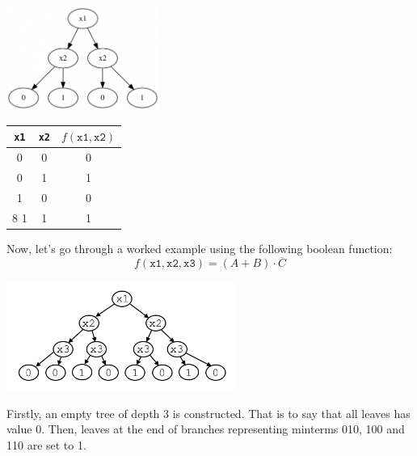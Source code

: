 \documentclass[12pt]{article}
\begin{document}
    \begin{minipage}{\linewidth}
        \begin{multicols}{2}
            \begin{center} \null \vfill
                \includegraphics[width=5cm, interpolate]{rsc/bt2.png}
                \parbox{\linewidth}{}

                \columnbreak
                \null \vfill

                \begin{tabular}[t]{ c|c|c }
                    \texttt{x1} & \texttt{x2}   & $f(\texttt{x1},\texttt{x2})$ \\ \hline
                    0           & 0             & 0 \\
                    0           & 1             & 1 \\ \hline\hline
                    1           & 0             & 0 \\8
                    1           & 1             & 1
                \end{tabular}  \null \vspace{2ex}
                \parbox{\linewidth}{}
            \end{center}
        \end{multicols}
    \end{minipage}

    \pagebreak

    Now, let's go through a worked example using the following boolean function: \[f(\texttt{x1},\texttt{x2},\texttt{x3})=(A+B)\cdot\overline{C}\] \vspace{-6ex}
    \begin{center}
        \includegraphics[width=7.5cm, interpolate]{rsc/bt3.png}
        \parbox{\linewidth}{}
    \end{center} \vspace{-3ex}
    Firstly, an empty tree of depth 3 is constructed. That is to say that all leaves has value 0. Then, leaves at the end of branches representing minterms 010, 100 and 110 are set to 1.
\end{document}
